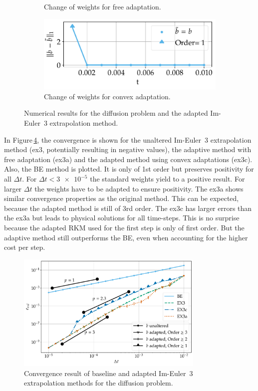 \documentclass[a4paper]{article}
\numberwithin{equation}{section}
\theoremstyle{plain}
\theoremstyle{definition}
\numberwithin{theorem}{section}
\newcommand{\dt}{{\Delta t}}
\newcommand{\1}{\mathbbm{1}}
\begin{document}
\begin{figure}
\begin{subfigure}[b]{0.45\textwidth}
\caption{Change of weights for free adaptation.}
\label{fig:weights_Diff_a}
\end{subfigure}
\begin{subfigure}[b]{0.45\textwidth}
\centering
\includegraphics[width=1\textwidth]{plots/b_Diff_Convex.pdf}
\caption{Change of weights for convex adaptation.}
\label{fig:weights_Diff_c}
\end{subfigure}
\caption{Numerical results for the diffusion problem and the
         adapted Im-Euler~3 extrapolation method.}
\end{figure}


In Figure\,\ref{fig:conv_impl}, the convergence is shown for the unaltered Im-Euler~3 extrapolation method (ex3, potentially resulting in negative values), the adaptive method with free adaptation (ex3a) and the adapted method using convex adaptations (ex3c).
Also, the BE method is plotted. It is only of 1st order but preserves positivity for all $\dt$. 
For $\dt < \num{3e-5} $ the standard weights yield to a positive result. For larger $\dt$ the weights have to be adapted to ensure positivity. 
The ex3a shows similar convergence properties as the original method.
This can be expected, because the adapted method is still of 3rd order. 
The ex3c has larger errors than the ex3a but leads to physical solutions for all time-steps.
This is no surprise because the adapted RKM used for the first step is only of first order.
But the adaptive method still outperforms the BE, even when accounting for the higher cost per step. 

\begin{figure}[ht]
\centering
\includegraphics[width=0.8\textwidth]{plots/conv_heat.pdf}
\caption{Convergence result of baseline and adapted Im-Euler~3
         extrapolation methods for the diffusion problem.}
\label{fig:conv_impl}
\end{figure}
\end{document}
